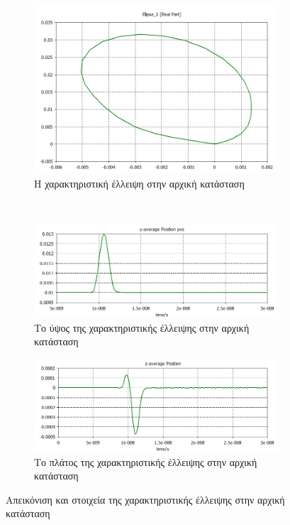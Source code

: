 \begin{figure}[tph]	
\centering
	\begin{subfigure}{0.7\textwidth}
		\includegraphics[width=\linewidth]{figures/CST-variable-analysis/CST-initial-ellipse}
		\centering
		\caption{Η χαρακτηριστική έλλειψη στην αρχική κατάσταση}
		\label{fig:CST-variable-analysis-initial-ellipse}
	\end{subfigure}
	~
	\begin{subfigure}{0.47\textwidth}
		\includegraphics[width=\linewidth]{figures/CST-variable-analysis/CST-initial-ellipse-height}
		\centering
		\caption{Το ύψος της χαρακτηριστικής έλλειψης στην αρχική κατάσταση}
		\label{fig:CST-variable-analysis-initial-ellipse-height}
	\end{subfigure}
	\hfill
	\begin{subfigure}{0.47\textwidth}
		\includegraphics[width=\linewidth]{figures/CST-variable-analysis/CST-initial-ellipse-width}
		\centering
		\caption{Το πλάτος της χαρακτηριστικής έλλειψης στην αρχική κατάσταση}
		\label{fig:CST-variable-analysis-initial-ellipse-width}
	\end{subfigure}	
\caption{Απεικόνιση και στοιχεία της χαρακτηριστικής έλλειψης στην αρχική κατάσταση}
\label{fig:CST-initial-ellipse}
\end{figure}

